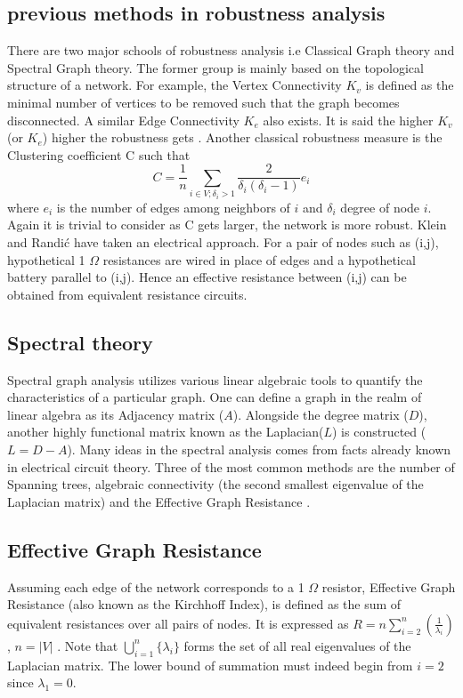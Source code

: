 \documentclass{article}
\begin{document}
	\subsection{previous methods in robustness analysis}
	There are two major schools of robustness analysis i.e Classical Graph theory and Spectral Graph theory. The former group is mainly based on the topological structure of a network. For example, the Vertex Connectivity $K_v$ is defined as the minimal number of vertices to be removed such that the graph becomes disconnected. A similar Edge Connectivity $K_e$ also exists. It is said the higher $K_v$ (or $K_e$) higher the robustness gets \cite{ellens2013graph}. Another classical robustness measure is the Clustering coefficient \cite{watts1998collective} C such that
	\begin{equation}
		C = \frac{1}{n} \sum_{i\in V;\delta_i>1}\frac{2}{\delta_i(\delta_i -1)}e_i
	\end{equation}
	where $e_i$ is the number of edges among neighbors of $i$ and $\delta_i$ degree of node $i$. Again it is trivial to consider as C gets larger, the network is more robust.
	Klein and Randi\'{c} \cite{klein1993m} have taken an electrical approach. For a pair of nodes such as (i,j), hypothetical 1 $\Omega$ resistances are wired in place of edges and a hypothetical battery parallel to (i,j). Hence an effective resistance between (i,j) can be obtained from equivalent resistance circuits.
	
	\subsection{Spectral theory}
	Spectral graph analysis utilizes various linear algebraic tools	to quantify the characteristics of a particular graph. One can define a graph in the realm of linear algebra as its Adjacency matrix ($A$). Alongside the degree matrix ($D$), another highly functional matrix known as the Laplacian($L$) is constructed ($L=D-A$). Many ideas in the spectral analysis comes from facts already known in electrical circuit theory. Three of the most common methods are the number of Spanning trees, algebraic connectivity (the second smallest eigenvalue of the Laplacian matrix) and the Effective Graph Resistance \cite{ellens2013graph}.
	
	\subsection{Effective Graph Resistance}
	Assuming each edge of the network corresponds to a 1 $\Omega$ resistor, Effective Graph Resistance (also known as the Kirchhoff Index), is defined as the sum of equivalent resistances over all pairs of nodes. It is expressed as
	$R = n \sum_{i=2}^{n}(\frac{1}{\lambda_{i}})$, $n = |V|$ \cite{klein1993m}\cite{yamashita2021effective}. Note that $\bigcup_{i=1}^{n} \{\lambda_i\}$ forms the set of all real eigenvalues of the Laplacian matrix. The lower bound of summation must indeed begin from $i=2$ since $\lambda_1 = 0$.
	
\end{document}
